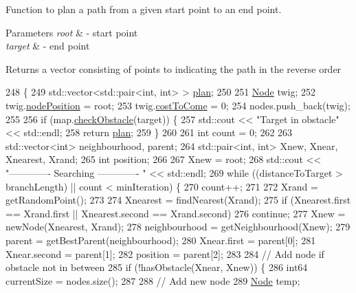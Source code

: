 Function to plan a path from a given start point to an end point. 


\begin{DoxyParams}{Parameters}
{\em root} & -\/ start point \\
\hline
{\em target} & -\/ end point \\
\hline
\end{DoxyParams}
\begin{DoxyReturn}{Returns}
a vector consisting of points to indicating the path in the reverse order 
\end{DoxyReturn}

\begin{DoxyCode}
248                                                       \{
249   std::vector<std::pair<int, int> > \hyperlink{classRRTStarPlanner_afee7f772c5ff1372b21da124b9818b23}{plan};
250 
251   \hyperlink{classNode}{Node} twig;
252   twig.\hyperlink{classNode_a9d7c1d9729c5e196ccf79ef026ce07bb}{nodePosition} = root;
253   twig.\hyperlink{classNode_a4e05c65e3c90bddfaa1f2b24ee06949f}{costToCome} = 0;
254   nodes.push\_back(twig);
255 
256   \textcolor{keywordflow}{if} (map.\hyperlink{classMapManager_a1057b862a4d78c41b50307b64b273b1d}{checkObstacle}(target)) \{
257     std::cout << \textcolor{stringliteral}{"Target in obstacle"} << std::endl;
258     \textcolor{keywordflow}{return} \hyperlink{classRRTStarPlanner_afee7f772c5ff1372b21da124b9818b23}{plan};
259   \}
260 
261   \textcolor{keywordtype}{int} count = 0;
262 
263   std::vector<int> neighbourhood, parent;
264   std::pair<int, int> Xnew, Xnear, Xnearest, Xrand;
265   \textcolor{keywordtype}{int} position;
266 
267   Xnew = root;
268   std::cout << \textcolor{stringliteral}{"------------- Searching ------------- "} << std::endl;
269   \textcolor{keywordflow}{while} ((distanceToTarget > branchLength) || count < minIteration) \{
270     count++;
271 
272     Xrand = getRandomPoint();
273 
274     Xnearest = findNearest(Xrand);
275     \textcolor{keywordflow}{if} (Xnearest.first == Xrand.first || Xnearest.second == Xrand.second)
276       \textcolor{keywordflow}{continue};
277     Xnew = newNode(Xnearest, Xrand);
278     neighbourhood = getNeighbourhood(Xnew);
279     parent = getBestParent(neighbourhood);
280     Xnear.first = parent[0];
281     Xnear.second = parent[1];
282     position = parent[2];
283 
284     \textcolor{comment}{// Add node if obstacle not in between}
285     \textcolor{keywordflow}{if} (!hasObstacle(Xnear, Xnew)) \{
286       int64 currentSize = nodes.size();
287 
288       \textcolor{comment}{// Add new node}
289       \hyperlink{classNode}{Node} temp;

\end{DoxyCode}
